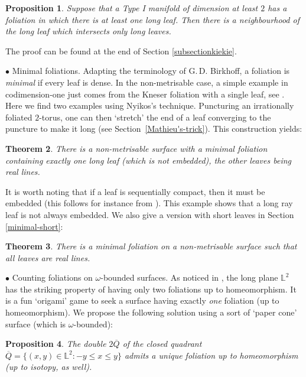 \documentclass{amsart}
\newtheorem{theorem}{Theorem}[section]
\newtheorem{prop}[theorem]{Proposition}
\begin{document}
\begin{prop}\label{long-stability}
Suppose that a Type I manifold of dimension at least $2$ has a foliation in which there is at least one long leaf. Then there is a neighbourhood of the long leaf which intersects only long leaves.
\end{prop}

The proof can be found at the end of Section \ref{subsectionkiekie}.

\medskip
\noindent$\bullet$ {\sc Minimal foliations.} Adapting the terminology of G.\,D. Birkhoff, a foliation is \emph{minimal} if every leaf is dense.  In the non-metrisable case,  a simple example in codimension-one just comes from the Kneser foliation with a single leaf, see \cite[Section~2]{BGG1}. Here we find two examples using Nyikos's technique. Puncturing an irrationally foliated $2$-torus, one can then `stretch' the end of a leaf converging to the puncture to make it long (see Section~\ref{Mathieu's-trick}). This construction yields:

\begin{theorem}\label{miminallong}
  There is a non-metrisable surface with a minimal foliation containing exactly one long leaf (which is not embedded), the other leaves being real lines.
\end{theorem}

It is worth noting that if a leaf is sequentially compact, then it must be embedded (this follows for instance from \cite[Lemma 2.8]{GGDynamics}). This example shows that a long ray leaf is not always embedded. We also give a version with short leaves in Section \ref{minimal-short}:

\begin{theorem}\label{thmmoorised-torus} 
  There is a minimal foliation on a non-metrisable surface such that all leaves are real lines.
\end{theorem}

\medskip
\noindent$\bullet$ {\sc Counting foliations on $\omega$-bounded surfaces.}
As noticed in \cite[Corollary~6.5]{BGG}, the long plane ${\mathbb{L}}^2$ has the striking property of having only two foliations up to homeomorphism. It is a fun `origami' game to seek a surface having exactly {\it one} foliation (up to homeomorphism). We propose the following solution using a sort of `paper cone' surface (which is $\omega$-bounded):

\begin{prop} \label{one-foliation}
The double $2\overline{Q}$ of the closed quadrant $\overline{Q}=\{(x,y)\in {\mathbb L}^2 : -y \le x\le y\}$ admits a unique foliation up to homeomorphism (up to isotopy, as well).
\end{prop}
 
\end{document}

